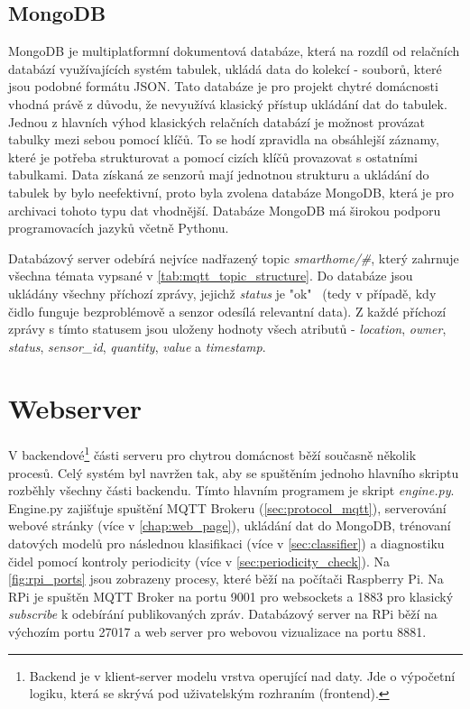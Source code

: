 \subsection*{MongoDB}
MongoDB \cite{MongoDB:online} je multiplatformní dokumentová databáze, která na rozdíl od relačních databází využívajících systém tabulek, ukládá data do kolekcí - souborů, které jsou podobné formátu JSON. Tato databáze je pro projekt chytré domácnosti vhodná právě z důvodu, že nevyužívá klasický přístup ukládání dat do tabulek. Jednou z hlavních výhod klasických relačních databází je možnost provázat tabulky mezi sebou pomocí klíčů. To se hodí zpravidla na obsáhlejší záznamy, které je potřeba strukturovat a pomocí cizích klíčů provazovat s ostatními tabulkami. Data získaná ze senzorů mají jednotnou strukturu a ukládání do tabulek by bylo neefektivní, proto byla zvolena databáze MongoDB, která je pro archivaci tohoto typu dat vhodnější. Databáze MongoDB má širokou podporu programovacích jazyků včetně Pythonu. \par
Databázový server odebírá nejvíce nadřazený topic \textit{smarthome/\#}, který zahrnuje všechna témata vypsané v \cref{tab:mqtt_topic_structure}. Do databáze jsou ukládány všechny příchozí zprávy, jejichž \textit{status} je "ok" \ (tedy v případě, kdy čidlo funguje bezproblémově a senzor odesílá relevantní data). Z každé příchozí zprávy s tímto statusem jsou uloženy hodnoty všech atributů - \textit{location}, \textit{owner}, \textit{status}, \textit{sensor\_id}, \textit{quantity}, \textit{value} a \textit{timestamp}. \par

\section{Webserver} \label{sec:webserver}

V backendové\footnote{Backend je v klient-server modelu vrstva operující nad daty. Jde o výpočetní logiku, která se skrývá pod uživatelským rozhraním (frontend).} části serveru pro chytrou domácnost běží současně několik procesů. Celý systém byl navržen tak, aby se spuštěním jednoho hlavního skriptu rozběhly všechny části backendu. Tímto hlavním programem je skript \textit{engine.py}. Engine.py zajišťuje spuštění MQTT Brokeru (\cref{sec:protocol_mqtt}), serverování webové stránky (více v \cref{chap:web_page}), ukládání dat do MongoDB, trénovaní datových modelů pro následnou klasifikaci (více v \cref{sec:classifier}) a diagnostiku čidel pomocí kontroly periodicity (více v \cref{sec:periodicity_check}).  Na \cref{fig:rpi_ports} jsou zobrazeny procesy, které běží na počítači Raspberry Pi. Na RPi je spuštěn MQTT Broker na portu 9001 pro websockets a 1883 pro klasický \textit{subscribe} k odebírání publikovaných zpráv. Databázový server na RPi běží na výchozím portu 27017 a web server pro webovou vizualizace na portu 8881. 


